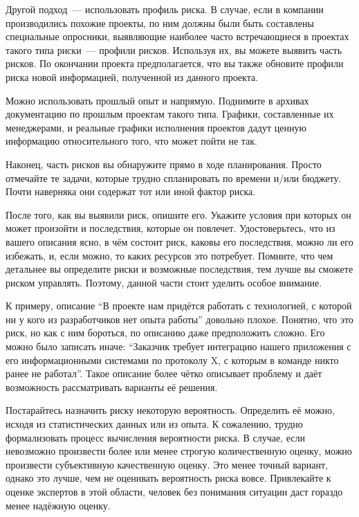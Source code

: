 \documentclass{../../text-style}
\begin{document}
Другой подход~--- использовать профиль риска. В случае, если в компании производились похожие проекты, по ним должны были быть составлены специальные опросники, выявляющие наиболее часто встречающиеся в проектах такого типа риски~--- профили рисков. Используя их, вы можете выявить часть рисков. По окончании проекта предполагается, что вы также обновите профили риска новой информацией, полученной из данного проекта.

Можно использовать прошлый опыт и напрямую. Поднимите в архивах документацию по прошлым проектам такого типа. Графики, составленные их менеджерами, и реальные графики исполнения проектов дадут ценную информацию относительного того, что может пойти не так.

Наконец, часть рисков вы обнаружите прямо в ходе планирования. Просто отмечайте те задачи, которые трудно спланировать по времени и/или бюджету. Почти наверняка они содержат тот или иной фактор риска.

После того, как вы выявили риск, опишите его. Укажите условия при которых он может произойти и последствия, которые он повлечет. Удостоверьтесь, что из вашего описания ясно, в чём состоит риск, каковы его последствия, можно ли его избежать, и, если можно, то каких ресурсов это потребует. Помните, что чем детальнее вы определите риски и возможные последствия, тем лучше вы сможете риском управлять. Поэтому, данной части стоит уделить особое внимание.

К примеру, описание \enquote{В проекте нам придётся работать с технологией, с которой ни у кого из разработчиков нет опыта работы} довольно плохое. Понятно, что это риск, но как с ним бороться, по описанию даже предположить сложно. Его можно было записать иначе: \enquote{Заказчик требует интеграцию нашего приложения с его информационными системами по протоколу X, с которым в команде никто ранее не работал}. Такое описание более чётко описывает проблему и даёт возможность рассматривать варианты её решения.

Постарайтесь назначить риску некоторую вероятность. Определить её можно, исходя из статистических данных или из опыта. К сожалению, трудно формализовать процесс вычисления вероятности риска. В случае, если невозможно произвести более или менее строгую количественную оценку, можно произвести субъективную качественную оценку. Это менее точный вариант, однако это лучше, чем не оценивать вероятность риска вовсе. Привлекайте к оценке экспертов в этой области, человек без понимания ситуации даст гораздо менее надёжную оценку.
\end{document}
